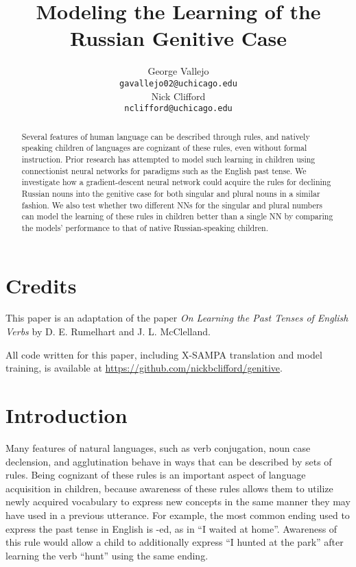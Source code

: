 \documentclass[11pt,a4paper]{article}
\title{Modeling the Learning of the Russian Genitive Case}
\author{George Vallejo \\
  \texttt{gavallejo02@uchicago.edu} \\\And
  Nick Clifford \\
  \texttt{nclifford@uchicago.edu} \\}
\date{}
\begin{document}
\maketitle
\begin{abstract}
  Several features of human language can be described through rules,
  and natively speaking children of languages are cognizant of these rules, 
  even without formal instruction. Prior research has attempted to model
  such learning in children using connectionist neural networks for
  paradigms such as the English past tense. We investigate how a gradient-descent
  neural network could acquire the rules for declining Russian nouns into
  the genitive case for both singular and plural nouns in a similar fashion. 
  We also test whether two different NNs for the singular and plural numbers
  can model the learning of these rules in children better than a single
  NN by comparing the models' performance to that of native Russian-speaking children.

\end{abstract}

\section{Credits}

  This paper is an adaptation of the paper
  \emph{On Learning the Past Tenses of English Verbs} by D. E. Rumelhart and
  J. L. McClelland.
  
  All code written for this paper, including X-SAMPA translation and model training,
  is available at \url{https://github.com/nickbclifford/genitive}.

\section{Introduction}

Many features of natural languages, such as verb conjugation, noun case
declension, and agglutination behave in ways that can be described
by sets of rules. Being cognizant of these rules is an important aspect
of language acquisition in children, because awareness of these rules allows
them to utilize newly acquired vocabulary to express new concepts in the same
manner they may have used in a previous utterance. For example, the most common
ending used to express the past tense in English is -ed, as in ``I waited at home''.
Awareness of this rule would allow a child to additionally express ``I hunted at
the park'' after learning the verb ``hunt'' using the same ending.
\end{document}
